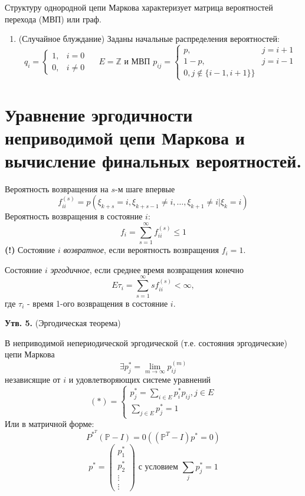 Структуру однородной цепи Маркова характеризует матрица вероятностей перехода (МВП) или граф.
\begin{enumerate}
	\item (Случайное блуждание) Заданы начальные распределения вероятностей:
	\[
	q_i =
	\begin{cases}
		1, &i = 0 \\
		0, &i \ne 0
	\end{cases}
	~~~~~~
	E = \mathbb{Z} \text{ и МВП }
	p_{ij} =
	\begin{cases}
		p, &j = i + 1 \\
		1 - p, &j = i - 1 \\
		0, j \notin \{i-1,i+1\}\}
	\end{cases}
	\]
\end{enumerate}

\section{Уравнение эргодичности неприводимой цепи Маркова и вычисление финальных вероятностей.}

\noindent Вероятность возвращения на $s$-м шаге впервые
\[ f_{ii}^{(s)} = p (\xi_{k + s} = i, \xi_{k+s-1} \ne i, \dots, \xi_{k+1} \ne i | \xi_k = i) \]
Вероятность возвращения в состояние $i$:
\[ f_i = \sum_{s=1}^{\infty} f_{ii}^{(s)} \le 1 \]
\textbf{(!)} Состояние $i$ \textit{возвратное}, если вероятность возвращения $f_i = 1$.

Состояние $i$ \textit{эргодичное}, если среднее время возвращения конечно
\[ E \tau_i = \sum_{s=1}^{\infty} s f_{ii}^{(s)} < \infty, \]
где $\tau_i$ - время 1-ого возвращения в состояние $i$.

\textbf{Утв. 5.} (Эргодическая теорема)

\noindent В неприводимой непериодической эргодической (т.е. состояния эргодические) цепи Маркова
\[ \exists p_{j}^{*} = \lim_{m \to \infty} p_{ij}^{(m)} \]
независящие от $i$ и удовлетворяющих системе уравнений
\[
(*) =
\begin{cases}
	p_{j}^{*} = \sum\limits_{i \in E} p_{i}^{*} p_{ij}, j \in E \\
	\sum\limits_{j \in E} p_{j}^{*} = 1
\end{cases}
\]
Или в матричной форме:
\[
P^{*^T} (\mathbb{P} - I) = 0 ( (\mathbb{P}^T - I)p^* = 0 )
\]
\[
p^{*}=
\begin{pmatrix}
	p_1^* \\ p_2^* \\ \vdots \\ \vdots
\end{pmatrix}
\text{ с условием } \sum_j p_j^* = 1
\]

